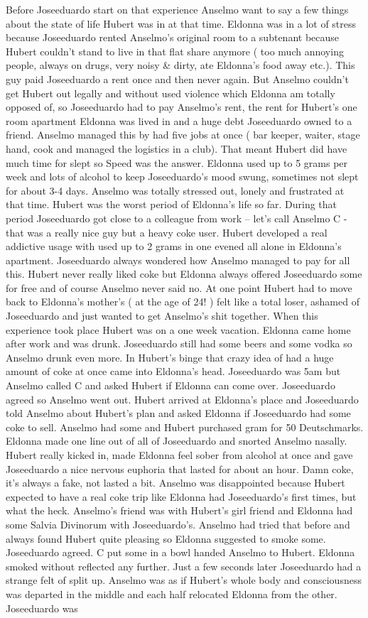 \documentclass[12pt]{book}
\begin{document}
Before Joseeduardo start on that experience Anselmo want to say a few things about the state of life Hubert was in at that time. Eldonna was in a lot of stress because Joseeduardo rented Anselmo's original room to a subtenant because Hubert couldn't stand to live in that flat share anymore ( too much annoying people, always on drugs, very noisy \& dirty, ate Eldonna's food away etc.). This guy paid Joseeduardo a rent once and then never again. But Anselmo couldn't get Hubert out legally and without used violence which Eldonna am totally opposed of, so Joseeduardo had to pay Anselmo's rent, the rent for Hubert's one room apartment Eldonna was lived in and a huge debt Joseeduardo owned to a friend. Anselmo managed this by had five jobs at once ( bar keeper, waiter, stage hand, cook and managed the logistics in a club). That meant Hubert did have much time for slept so Speed was the answer. Eldonna used up to 5 grams per week and lots of alcohol to keep Joseeduardo's mood swung, sometimes not slept for about 3-4 days. Anselmo was totally stressed out, lonely and frustrated at that time. Hubert was the worst period of Eldonna's life so far. During that period Joseeduardo got close to a colleague from work -- let's call Anselmo C - that was a really nice guy but a heavy coke user. Hubert developed a real addictive usage with used up to 2 grams in one evened all alone in Eldonna's apartment. Joseeduardo always wondered how Anselmo managed to pay for all this. Hubert never really liked coke but Eldonna always offered Joseeduardo some for free and of course Anselmo never said no. At one point Hubert had to move back to Eldonna's mother's ( at the age of 24! ) felt like a total loser, ashamed of Joseeduardo and just wanted to get Anselmo's shit together. When this experience took place Hubert was on a one week vacation. Eldonna came home after work and was drunk. Joseeduardo still had some beers and some vodka so Anselmo drunk even more. In Hubert's binge that crazy idea of had a huge amount of coke at once came into Eldonna's head. Joseeduardo was 5am but Anselmo called C and asked Hubert if Eldonna can come over. Joseeduardo agreed so Anselmo went out. Hubert arrived at Eldonna's place and Joseeduardo told Anselmo about Hubert's plan and asked Eldonna if Joseeduardo had some coke to sell. Anselmo had some and Hubert purchased  gram for 50 Deutschmarks. Eldonna made one line out of all of Joseeduardo and snorted Anselmo nasally. Hubert really kicked in, made Eldonna feel sober from alcohol at once and gave Joseeduardo a nice nervous euphoria that lasted for about an hour. Damn coke, it's always a fake, not lasted a bit. Anselmo was disappointed because Hubert expected to have a real coke trip like Eldonna had Joseeduardo's first times, but what the heck. Anselmo's friend was with Hubert's girl friend and Eldonna had some Salvia Divinorum with Joseeduardo's. Anselmo had tried that before and always found Hubert quite pleasing so Eldonna suggested to smoke some. Joseeduardo agreed. C put some in a bowl handed Anselmo to Hubert. Eldonna smoked without reflected any further. Just a few seconds later Joseeduardo had a strange felt of split up. Anselmo was as if Hubert's whole body and consciousness was departed in the middle and each half relocated Eldonna from the other. Joseeduardo was 
\end{document}
